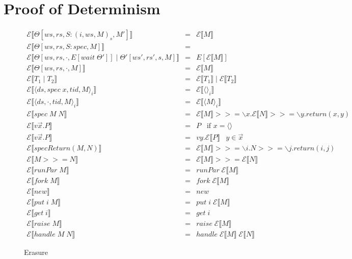 \documentclass[9pt]{article}
\newcommand{\eval}[1]{E[#1]}
\newcommand{\eraseHelper}[1]{\mathcal{E}\llbracket #1 \rrbracket}
\begin{document}
\section{Proof of Determinism}

\begin{figure}[H]
\centering

\begin{displaymath}
\begin{array}{rcll}

\eraseHelper{\Theta[ws, rs, S : (i, ws, M)_s, M']} &=& \eraseHelper{M} \\
\eraseHelper{\Theta[ws, rs, S : spec, M]} &=& \\
\eraseHelper{\Theta[ws, rs, \cdot, \eval{wait \; \Theta'}] \; | \; \Theta'[ws', rs', s, M]} &=& \eval{\eraseHelper{M}} \\
\eraseHelper{\Theta[ws, rs, \cdot, M]} &=& \eraseHelper{M} \\
\eraseHelper{T_1 \; | \; T_2} &=& \eraseHelper{T_1} \; | \; \eraseHelper{T_2} \\
\eraseHelper{ \langle ds, spec \; x, tid, M\rangle_i} &=& \eraseHelper{ \langle \rangle_i} \\
\eraseHelper{ \langle ds, \cdot, tid, M \rangle_i} &=& \eraseHelper{\langle M \rangle_i}\\
\eraseHelper{ spec \; M \; N} &=& \eraseHelper{M} >>= \backslash x . \eraseHelper{N} >>= \backslash y. return(x, y) \\
\eraseHelper{v\vec{x}.P} &=& P \;\;\; \text{if } x = \langle\rangle \\
\eraseHelper{v\vec{x}.P} &=& vy.\eraseHelper{P} \;\;\; y \in \vec{x} \\
\eraseHelper{specReturn(M, N)} &=& \eraseHelper{M} >>= \backslash i. N >>= \backslash j. return(i, j) \\
\eraseHelper{M >>= N} &=& \eraseHelper{M} >>= \eraseHelper{N}\\
\eraseHelper{runPar \; M} &=& runPar \; \eraseHelper{M} \\
\eraseHelper{fork \; M} &=& fork \; \eraseHelper{M} \\
\eraseHelper{new} &=& new \\
\eraseHelper{put \; i \; M} &=& put \; i \; \eraseHelper{M} \\
\eraseHelper{get \; i} &=& get \; i \\
\eraseHelper{raise \; M} &=& raise \; \eraseHelper{M} \\
\eraseHelper{handle \; M \; N} &=& handle \; \eraseHelper{M} \; \eraseHelper{N} 
\end{array}
\end{displaymath}
\caption{Erasure}
\end{figure}
\end{document}

